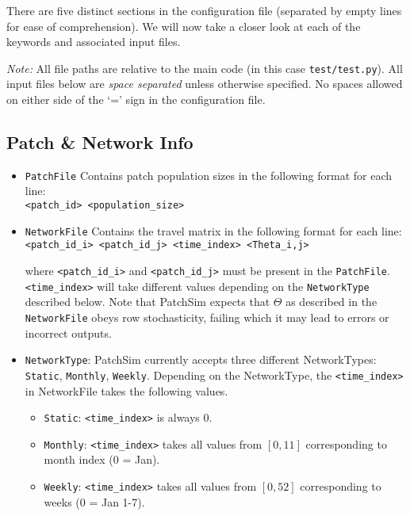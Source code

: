 \documentclass[10pt]{scrartcl}
\theoremstyle{definition}
\begin{document}
There are five distinct sections in the configuration file (separated by empty 
lines for ease of comprehension). We will now take a closer look at each of the 
keywords and associated input files. 

\textit{Note:} All file paths are relative to the main code (in this case 
\verb|test/test.py|). All input files below are \emph{space 
separated} unless otherwise specified. No spaces allowed on either side of the 
`=' sign in the configuration file.

\subsection{Patch \& Network Info}
\begin{itemize}
	\item \verb|PatchFile| Contains patch population sizes in the following 
	format for each line:\\
	\verb|<patch_id> <population_size>|
	
	\item \verb|NetworkFile| Contains the travel matrix in the following 
	format for each line:\\
	\verb|<patch_id_i> <patch_id_j> <time_index> <Theta_i,j>|
	
	where \verb|<patch_id_i>| and \verb|<patch_id_j>| must be present in the 
	 \verb|PatchFile|. \verb|<time_index>| will take different values 
	depending on the \verb|NetworkType| described below. Note that 	
	PatchSim expects that $\Theta$ as described in the \verb|NetworkFile|
	obeys row stochasticity, failing which it may lead to errors or incorrect 
	outputs.
	
	\item \verb|NetworkType|: PatchSim currently accepts three different 
	NetworkTypes: \verb|Static|, \verb|Monthly|, \verb|Weekly|. Depending on 
	the NetworkType, the \verb|<time_index>| in NetworkFile takes the following 
	values.
	\begin{itemize}
		\item \verb|Static|: \verb|<time_index>| is always $0$.
		\item \verb|Monthly|: \verb|<time_index>| takes all values from 
		$[0,11]$ corresponding to month index (0 = Jan). 
		\item \verb|Weekly|: \verb|<time_index>| takes all values from 
		$[0,52]$ corresponding to weeks (0 = Jan 1-7).
	\end{itemize}  
\end{itemize}
\end{document}
